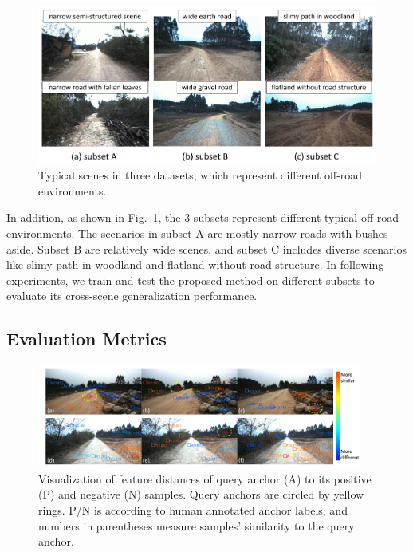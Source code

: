 \documentclass[letterpaper, 10 pt, conference]{ieeeconf}  %
\begin{document}
\begin{figure}[]
	\centering
	\includegraphics[scale=0.28]{dataset.pdf}
	\caption{Typical scenes in three datasets, which represent different off-road environments.}
	\label{fig:dataset}
\end{figure}

In addition, as shown in Fig.~\ref{fig:dataset}, the 3 subsets represent different typical off-road environments. The scenarios in subset A are mostly narrow roads with bushes aside. Subset B are relatively wide scenes, and subset C includes diverse scenarios like slimy path in woodland and flatland without road structure. In following experiments, we train and test the proposed method on different subsets to evaluate its cross-scene generalization performance.


\subsection{Evaluation Metrics}

\begin{figure}[]
	\centering
	\includegraphics[width=0.95\textwidth]{anchor_dis.pdf}
	\caption{Visualization of feature distances of query anchor (A) to its positive (P) and negative (N) samples. Query anchors are circled by yellow rings. P/N is according to human annotated anchor labels, and numbers in parentheses measure samples' similarity to the query anchor.}
	\label{fig:anchor_dis}
\end{figure}
\end{document}
